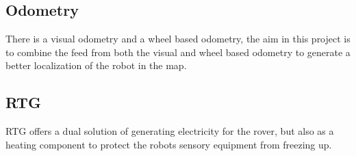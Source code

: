 \subsection{Odometry}
There is a visual odometry and a wheel based odometry, the aim in this project is to combine the feed from both the visual and wheel based odometry to generate a better localization of the robot in the map.


\subsection{RTG}
RTG offers a dual solution of generating electricity for the rover, but also as a heating component to protect the robots sensory equipment from freezing up.

\newpage

